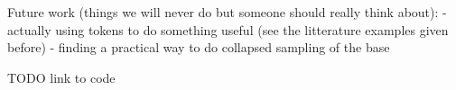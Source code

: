 Future work (things we will never do but someone should really think about):
- actually using tokens to do something useful (see the litterature examples given before)
- finding a practical way to do collapsed sampling of the base

TODO link to code
